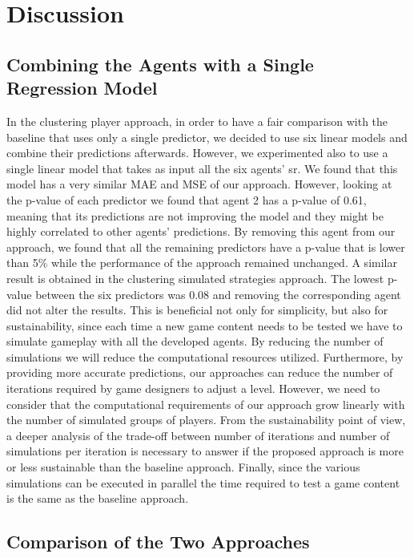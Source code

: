 \chapter{Discussion}
\label{chap:discussion}

\section{Combining the Agents with a Single Regression Model}
In the clustering player approach, in order to have a fair comparison with the baseline that uses only a single predictor, we decided to use six linear models and combine their predictions afterwards. However, we experimented also to use a single linear model that takes as input all the six agents' \acs{sr}. We found that this model has a very similar MAE and MSE of our approach. However, looking at the p-value of each predictor we found that agent 2 has a p-value of 0.61, meaning that its predictions are not improving the model and they might be highly correlated to other agents' predictions. By removing this agent from our approach, we found that all the remaining predictors have a p-value that is lower than 5\% while the performance of the approach remained unchanged. A similar result is obtained in the clustering simulated strategies approach. The lowest p-value between the six predictors was 0.08 and removing the corresponding agent did not alter the results. This is beneficial not only for simplicity, but also for sustainability, since each time a new game content needs to be tested we have to simulate gameplay with all the developed agents. By reducing the number of simulations we will reduce the computational resources utilized. Furthermore, by providing more accurate predictions, our approaches can reduce the number of iterations required by game designers to adjust a level. However, we need to consider that the computational requirements of our approach grow linearly with the number of simulated groups of players. From the sustainability point of view, a deeper analysis of the trade-off between number of iterations and number of simulations per iteration is necessary to answer if the proposed approach is more or less sustainable than the baseline approach. Finally, since the various simulations can be executed in parallel the time required to test a game content is the same as the baseline approach.


\section{Comparison of the Two Approaches}

